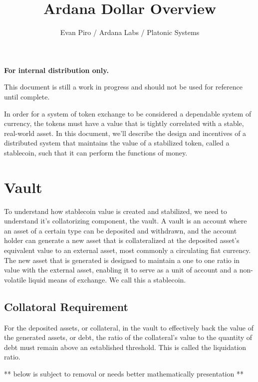 \documentclass[12pt]{article}
\title{Ardana Dollar Overview}
\author{Evan Piro / Ardana Labs / Platonic Systems}
\begin{document}
\maketitle

\begin{center}
	\textbf{For internal distribution only.}
\end{center}

\begin{center}
	\color{red} This document is still a work in progress and should not be used for reference until complete.
\end{center}

In order for a system of token exchange to be considered a dependable system of currency, the tokens must have a value that is tightly correlated with a stable, real-world asset. In this document, we'll describe the design and incentives of a distributed system that maintains the value of a stabilized token, called a stablecoin, such that it can perform the functions of money.

\section{Vault}

To understand how stablecoin value is created and stabilized, we need to understand it's collatorizing component, the vault. A vault is an account where an asset of a certain type can be deposited and withdrawn, and the account holder can generate a new asset that is collateralized at the deposited asset's equivalent value to an external asset, most commonly a circulating fiat currency. The new asset that is generated is designed to maintain a one to one ratio in value with the external asset, enabling it to serve as a unit of account and a non-volatile liquid means of exchange. We call this a stablecoin.

\subsection{Collatoral Requirement}

For the deposited assets, or collateral, in the vault to effectively back the value of the generated assets, or debt, the ratio of the collateral's value to the quantity of debt must remain above an established threshold. This is called the liquidation ratio.

** below is subject to removal or needs better mathematically presentation **
\end{document}
